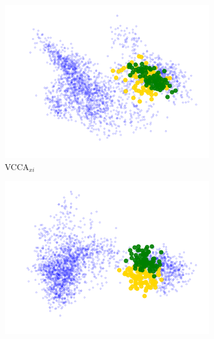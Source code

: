 

\begin{figure}[t]
     \centering
     \begin{subfigure}[b]{0.3\textwidth}
         \centering
         \includegraphics[width=\textwidth]{PaperB/figures_and_tables/latent_space_visualizations/juice_yoghurt_new/pca_latent_juice_yoghurt_vcca_xi_seed2.png}
         \caption{VCCA$_{x i}$}
         \label{fig:pca_vcca_xi_juice_yoghurt}
     \end{subfigure} 
     \begin{subfigure}[b]{0.3\textwidth}
         \centering
         \includegraphics[width=\textwidth]{PaperB/figures_and_tables/latent_space_visualizations/juice_yoghurt_new/pca_latent_juice_yoghurt_vcca_xw_seed2.png}

\end{subfigure}
\end{figure}

